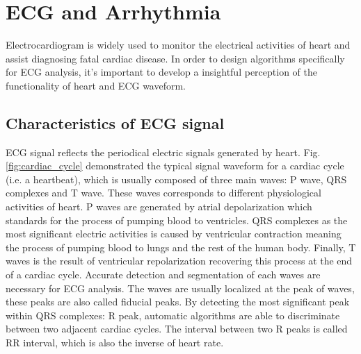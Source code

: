\section{ECG and Arrhythmia}

Electrocardiogram is widely used to monitor the electrical activities of heart and assist diagnosing fatal cardiac disease. In order to design algorithms specifically for ECG analysis, it's important to develop a insightful perception of the functionality of heart and ECG waveform.  

\subsection{Characteristics of ECG signal}

ECG signal reflects the periodical electric signals generated by heart. Fig.\ref{fig:cardiac_cycle} demonstrated the typical signal waveform for a cardiac cycle (i.e. a heartbeat), which is usually composed of three main waves: P wave, QRS complexes and T wave. These waves corresponds to different physiological activities of heart. P waves are generated by atrial depolarization which standards for the process of pumping blood to ventricles. QRS complexes as the most significant electric activities is caused by ventricular contraction meaning the process of pumping blood to lungs and the rest of the human body. Finally, T waves is the result of ventricular repolarization recovering this process at the end of a cardiac cycle. Accurate detection and segmentation of each waves are necessary for ECG analysis. The waves are usually localized at the peak of waves, these peaks are also called fiducial peaks. By detecting the most significant peak within QRS complexes: R peak, automatic algorithms are able to discriminate between two adjacent cardiac cycles. The interval between two R peaks is called RR interval, which is also the inverse of heart rate.

